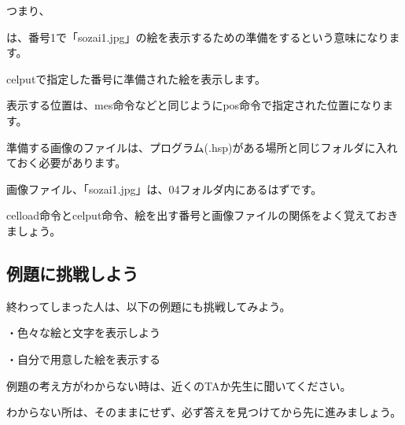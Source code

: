 つまり、


\begin{description}
    \item {}
\end{description}

は、番号1で「sozai1.jpg」の絵を表示するための準備をするという意味になります。

celputで指定した番号に準備された絵を表示します。

表示する位置は、mes命令などと同じようにpos命令で指定された位置になります。

準備する画像のファイルは、プログラム(.hsp)がある場所と同じフォルダに入れておく必要があります。

画像ファイル、「sozai1.jpg」は、04フォルダ内にあるはずです。


celload命令とcelput命令、絵を出す番号と画像ファイルの関係をよく覚えておきましょう。

\newpage
\subsection{例題に挑戦しよう}


終わってしまった人は、以下の例題にも挑戦してみよう。


・色々な絵と文字を表示しよう

・自分で用意した絵を表示する

例題の考え方がわからない時は、近くのTAか先生に聞いてください。

わからない所は、そのままにせず、必ず答えを見つけてから先に進みましょう。













